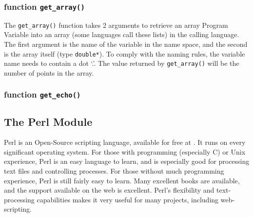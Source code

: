 \subsubsection{function {\tt{get\_array()}}}\label{Ch:Scripting-cc:getarray}

The {\tt{get\_array()}} function takes 2 arguments to retrieve an
{\ifeffit} array Program Variable into an array (some languages call these
lists) in the calling language.  The first argument is the name of the
variable in the {\ifeffit} name space, and the second is the array itself
(type {\tt{double*}}).  To comply with the {\ifeffit} naming rules, the
variable name needs to contain a dot `.'.  The value returned by
{\tt{get\_array()}} will be the number of points in the array.

\subsubsection{function {\tt{get\_echo()}}}\label{Ch:Scripting-cc:getecho}


\subsection{The {\ifeffit} Perl Module}\label{Ch:Scripting-perl}

Perl is an Open-Source scripting language, available for free at
{\WWWperl}.
It runs on every
significant operating system.  For those with programming (especially C) or
Unix experience, Perl is an easy language to learn, and is especially good
for processing text files and controlling processes.  For those without
much programming experience, Perl is still fairly easy to learn.  Many
excellent books{\cite{LearningPerl,CamelBook}} are available, and the
support available on the web is excellent.  Perl's flexibility and
text-processing capabilities makes it very useful for many projects,
including web-scripting.

